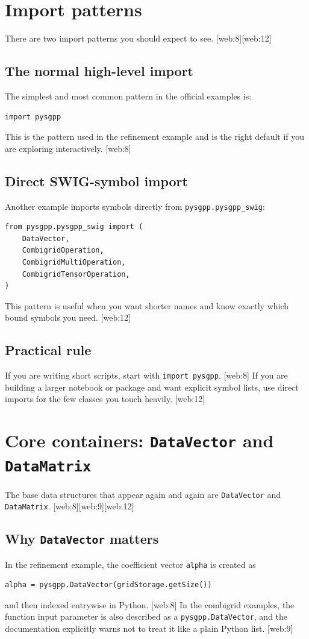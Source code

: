 \documentclass[11pt,a4paper]{article}
\begin{document}
\section{Import patterns}

There are two import patterns you should expect to see. [web:8][web:12]

\subsection{The normal high-level import}
The simplest and most common pattern in the official examples is:
\begin{lstlisting}[style=py]
import pysgpp
\end{lstlisting}
This is the pattern used in the refinement example and is the right default if you are exploring interactively. [web:8]  

\subsection{Direct SWIG-symbol import}
Another example imports symbols directly from \texttt{pysgpp.pysgpp\_swig}:
\begin{lstlisting}[style=py]
from pysgpp.pysgpp_swig import (
    DataVector,
    CombigridOperation,
    CombigridMultiOperation,
    CombigridTensorOperation,
)
\end{lstlisting}
This pattern is useful when you want shorter names and know exactly which bound symbols you need. [web:12]  

\subsection{Practical rule}
If you are writing short scripts, start with \texttt{import pysgpp}. [web:8]  
If you are building a larger notebook or package and want explicit symbol lists, use direct imports for the few classes you touch heavily. [web:12]  

\section{Core containers: \texttt{DataVector} and \texttt{DataMatrix}}

The base data structures that appear again and again are \texttt{DataVector} and \texttt{DataMatrix}. [web:8][web:9][web:12]  

\subsection{Why \texttt{DataVector} matters}
In the refinement example, the coefficient vector \texttt{alpha} is created as
\begin{lstlisting}[style=py]
alpha = pysgpp.DataVector(gridStorage.getSize())
\end{lstlisting}
and then indexed entrywise in Python. [web:8]  
In the combigrid examples, the function input parameter is also described as a \texttt{pysgpp.DataVector}, and the documentation explicitly warns not to treat it like a plain Python list. [web:9]  
\end{document}

